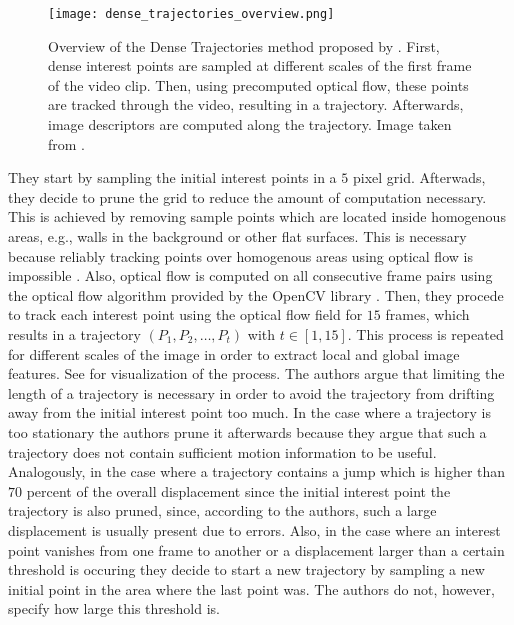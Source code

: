 \begin{figure}[htb!]
    \centering
    \texttt{[image: dense\_trajectories\_overview.png]}
    \caption{Overview of the Dense Trajectories method proposed by \cite{wang_dense_2013}. First, dense interest points are sampled at different scales of the first frame of the video clip. Then, using precomputed optical flow, these points are tracked through the video, resulting in a trajectory. Afterwards, image descriptors are computed along the trajectory. Image taken from \cite{wang_dense_2013}. }
    \label{fig:dense-trajectories-overview}
\end{figure}

They start by sampling the initial interest points in a $5$ pixel grid.
Afterwads, they decide to prune the grid to reduce the amount of computation necessary.
This is achieved by removing sample points which are located inside homogenous areas, e.g., walls in the background or other flat surfaces.
This is necessary because reliably tracking points over homogenous areas using optical flow is impossible \cite{wang_action_2013}.
Also, optical flow is computed on all consecutive frame pairs using the optical flow algorithm provided by the OpenCV library \cite{bradski_opencv_2000}.
Then, they procede to track each interest point using the optical flow field for $15$ frames, which results in a trajectory $(P_1, P_2, \dots, P_t)$ with $t \in [1, 15]$.
This process is repeated for different scales of the image in order to extract local and global image features.
See  for visualization of the process.
The authors argue that limiting the length of a trajectory is necessary in order to avoid the trajectory from drifting away from the initial interest point too much.
In the case where a trajectory is too stationary the authors prune it afterwards because they argue that such a trajectory does not contain sufficient motion information to be useful.
Analogously, in the case where a trajectory contains a jump which is higher than $70$ percent of the overall displacement since the initial interest point the trajectory is also pruned, since, according to the authors, such a large displacement is usually present due to errors.
Also, in the case where an interest point vanishes from one frame to another or a displacement larger than a certain threshold is occuring they decide to start a new trajectory by sampling a new initial point in the area where the last point was.
The authors do not, however, specify how large this threshold is.

